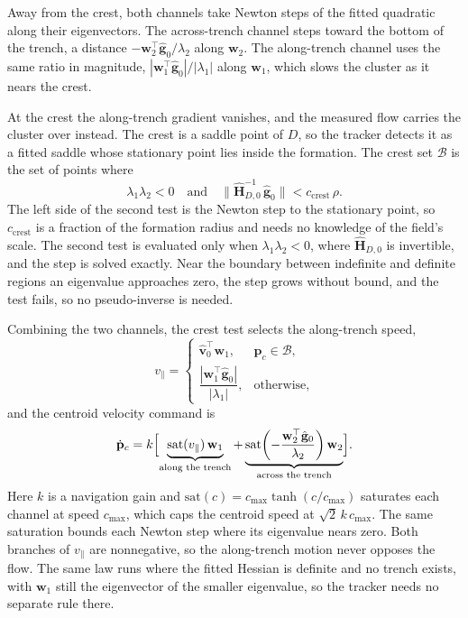 \documentclass[lettersize,journal]{IEEEtran}
\begin{document}
Away from the crest, both channels take Newton steps of the fitted
quadratic along their eigenvectors. The across-trench channel steps
toward the bottom of the trench, a distance
$-\mathbf{w}_2^\top\hat{\mathbf{g}}_0/\lambda_2$ along $\mathbf{w}_2$. The
along-trench channel uses the same ratio in magnitude,
$|\mathbf{w}_1^\top\hat{\mathbf{g}}_0|/|\lambda_1|$ along $\mathbf{w}_1$,
which slows the cluster as it nears the crest.

At the crest the along-trench gradient vanishes, and the measured flow
carries the cluster over instead. The crest is a saddle point of $D$, so
the tracker detects it as a fitted saddle whose stationary point lies
inside the formation. The crest set $\mathcal{B}$ is the set of points
where
\begin{equation}
    \lambda_1\lambda_2 < 0
    \quad\text{and}\quad
    \bigl\|\hat{\mathbf{H}}_{D,0}^{-1}\,\hat{\mathbf{g}}_0\bigr\|
        < c_{\mathrm{crest}}\,\rho.
    \label{eq:band}
\end{equation}
The left side of the second test is the Newton step to the stationary
point, so $c_{\mathrm{crest}}$ is a fraction of the formation radius and
needs no knowledge of the field's scale. The second test is evaluated only
when $\lambda_1\lambda_2 < 0$, where $\hat{\mathbf{H}}_{D,0}$ is invertible,
and the step is solved exactly. Near the boundary between indefinite and
definite regions an eigenvalue approaches zero, the step grows without
bound, and the test fails, so no pseudo-inverse is needed.

Combining the two channels, the crest test selects the along-trench speed,
\begin{equation}
    v_\parallel =
    \begin{cases}
        \hat{\mathbf{v}}_0^\top \mathbf{w}_1,
            & \mathbf{p}_c \in \mathcal{B}, \\[6pt]
        \dfrac{|\mathbf{w}_1^\top \hat{\mathbf{g}}_0|}{|\lambda_1|},
            & \text{otherwise},
    \end{cases}
    \label{eq:vpar}
\end{equation}
and the centroid velocity command is
\begin{equation}
    \dot{\mathbf{p}}_c = k\Bigl[
    \underbrace{\mathrm{sat}(v_\parallel)\,\mathbf{w}_1}_{\text{along the trench}}
    + \underbrace{\mathrm{sat}\!\left(-\frac{\mathbf{w}_2^\top
      \hat{\mathbf{g}}_0}{\lambda_2}\right)\mathbf{w}_2}_{\text{across the trench}}\Bigr].
    \label{eq:d_law}
\end{equation}
Here $k$ is a navigation gain and
$\mathrm{sat}(c) = c_{\max}\tanh(c/c_{\max})$ saturates each channel at
speed $c_{\max}$, which caps the centroid speed at $\sqrt{2}\,k\,c_{\max}$.
The same saturation bounds each Newton step where its eigenvalue nears zero.
Both branches of $v_\parallel$ are nonnegative, so the along-trench
motion never opposes the flow. The same law runs where the fitted Hessian
is definite and no trench exists, with $\mathbf{w}_1$ still the
eigenvector of the smaller eigenvalue, so the tracker needs no separate
rule there.
\end{document}
